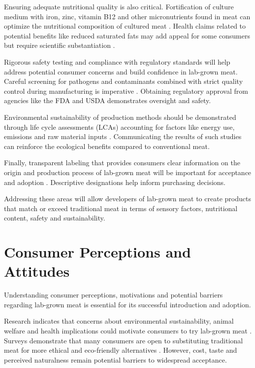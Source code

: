 \documentclass[10pt]{article}
\begin{document}
\begin{sloppypar}
  Ensuring adequate nutritional quality is also critical. Fortification of culture medium with iron, zinc, vitamin B12 and other micronutrients found in meat can optimize the nutritional composition of cultured meat \citep{fraeye_sensorial_2020}. Health claims related to potential benefits like reduced saturated fats may add appeal for some consumers but require scientific substantiation \citep{sergelidis_lab_2019}.

  Rigorous safety testing and compliance with regulatory standards will help address potential consumer concerns and build confidence in lab-grown meat. Careful screening for pathogens and contaminants combined with strict quality control during manufacturing is imperative \citep{ong_food_2021}. Obtaining regulatory approval from agencies like the FDA and USDA demonstrates oversight and safety.

  Environmental sustainability of production methods should be demonstrated through life cycle assessments (LCAs) accounting for factors like energy use, emissions and raw material inputs \citep{mattick_anticipatory_2015}. Communicating the results of such studies can reinforce the ecological benefits compared to conventional meat.

  Finally, transparent labeling that provides consumers clear information on the origin and production process of lab-grown meat will be important for acceptance and adoption \citep{failla_evaluation_2023}. Descriptive designations help inform purchasing decisions.

  Addressing these areas will allow developers of lab-grown meat to create products that match or exceed traditional meat in terms of sensory factors, nutritional content, safety and sustainability.

  \section{Consumer Perceptions and Attitudes}
  \label{sec:consumer-perceptions-and-attitudes}

  Understanding consumer perceptions, motivations and potential barriers regarding lab-grown meat is essential for its successful introduction and adoption.

  Research indicates that concerns about environmental sustainability, animal welfare and health implications could motivate consumers to try lab-grown meat \citep{circus_exploring_2018}. Surveys demonstrate that many consumers are open to substituting traditional meat for more ethical and eco-friendly alternatives \citep{verbeke_would_2015}. However, cost, taste and perceived naturalness remain potential barriers to widespread acceptance.


\end{sloppypar}
\end{document}
